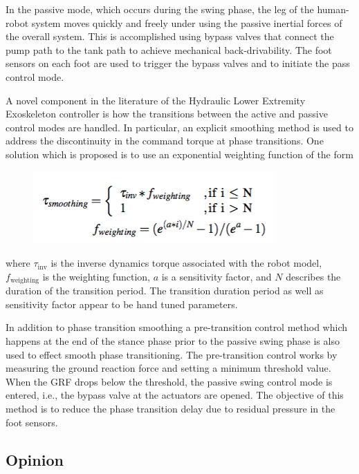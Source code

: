 In the passive mode, which occurs during the swing phase, the leg of the human-robot system moves quickly and freely under using the passive inertial forces of the overall system.  This is accomplished using bypass valves that connect the pump path to the tank path to achieve mechanical back-drivability.  The foot sensors on each foot are used to trigger the bypass valves and to initiate the pass control mode.

A novel component in the literature of the Hydraulic Lower Extremity Exoskeleton controller is how the transitions between the active and passive control modes are handled.  In particular, an explicit smoothing method is used to address the discontinuity in the command torque at phase transitions.  One solution which is proposed is to use an exponential weighting function of the form
 \begin{figure}[thpb]
\centering
\includegraphics[width=3.in]{exos/figs/hydLowerExrem/weightingForm}
  \caption{}
 \end{figure}
 
 \noindent
 where $\tau_\text{inv}$ is the inverse dynamics torque associated with the robot model, $f_\text{weighting}$ is the weighting function, $a$ is a sensitivity factor, and $N$ describes the duration of the transition period.  The transition duration period as well as sensitivity factor appear to be hand tuned parameters. 

In addition to phase transition smoothing a pre-transition control method which happens at the end of the stance phase prior to the passive swing phase is also used to effect smooth phase transitioning.  The pre-transition control works by measuring the ground reaction force and setting a minimum threshold value.  When the GRF drops below the threshold, the passive swing control mode is entered, i.e., the bypass valve at the actuators are opened.  The objective of this method is to reduce the phase transition delay due to residual pressure in the foot sensors. 


 
 \subsection{Opinion}
 
